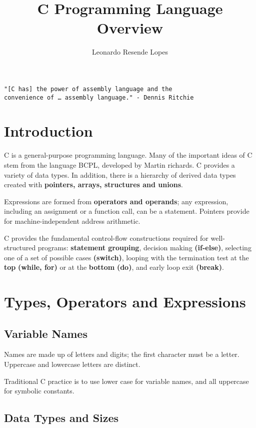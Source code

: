 \documentclass{article}
\title{C Programming Language Overview}
\author{Leonardo Resende Lopes}
\date{}
\begin{document}
\maketitle

\clearpage
\begin{verbatim}
"[C has] the power of assembly language and the 
convenience of … assembly language." - Dennis Ritchie
\end{verbatim}

\clearpage
\section{Introduction}

\clearpage
C is a general-purpose programming language.
Many of the important ideas of C stem from the language BCPL, developed by Martin richards. 
C provides a variety of data types. In addition, there is a hierarchy of derived data types created with \textbf{pointers, arrays, structures and unions}.

Expressions are formed from \textbf{operators and operands}; any expression, including an assignment or a function call, can be a statement. Pointers provide for machine-independent address arithmetic.

C provides the fundamental control-flow constructions required for well-structured programs: \textbf{statement grouping}, decision making \textbf{(if-else)}, selecting one of a set of possible cases \textbf{(switch)}, looping with the termination test at the \textbf{top} \textbf{(while, for)} or at the \textbf{bottom} \textbf{(do)}, and early loop exit \textbf{(break)}.




\clearpage
\section{Types, Operators and Expressions}

\subsection{Variable Names}

\medskip Names are made up of letters and digits; the first character must be a letter.
Uppercase and lowercase letters are distinct. 

Traditional C practice is to use lower case for variable names, and all uppercase for symbolic constants.

\subsection{Data Types and Sizes}
\end{document}
